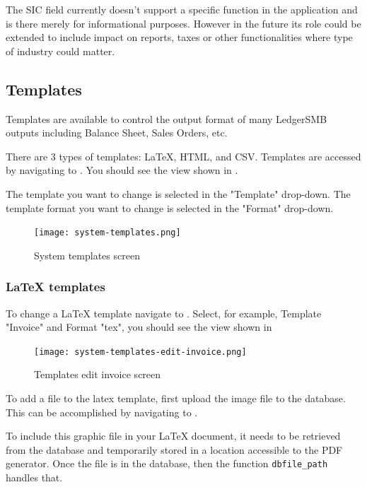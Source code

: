 The SIC field currently doesn't support a specific function in the application and is there
merely for informational purposes. However in the future its role could be extended to include
impact on reports, taxes or other functionalities where type of industry could matter.

\subsection {Templates}
\label{subsec-company-config-templates}

Templates are available to control the output format of many LedgerSMB outputs including Balance Sheet, Sales Orders, etc.

There are 3 types of templates: \LaTeX, HTML, and CSV.
Templates are accessed by navigating to .
You should see the view shown in .

The template you want to change is selected in the "Template" drop-down. The template format you want to change is selected in the "Format" drop-down.

\begin{figure}[h]
        \centering
        \texttt{[image: system-templates.png]}
        \caption{System templates screen}
        \label{fig:system-templates}
\end{figure}

\subsubsection{\LaTeX{} templates}
\label{subsec-company-config-latex-templates}

To change a \LaTeX{} template navigate to .
Select, for example, Template "Invoice" and Format "tex", you should see the view shown in 

\begin{figure}[h]
        \centering
        \texttt{[image: system-templates-edit-invoice.png]}
        \caption{Templates edit invoice screen}
        \label{fig:system-templates-edit-invoice}
\end{figure}

To add a file to the latex template, first upload the image file to the database.  
This can be accomplished by navigating to .

To include this graphic file in your \LaTeX{} document, it needs to be retrieved from
the database and temporarily stored in a location accessible to the PDF
generator. Once the file is in the database, then the function \texttt{dbfile\_path} handles that.

